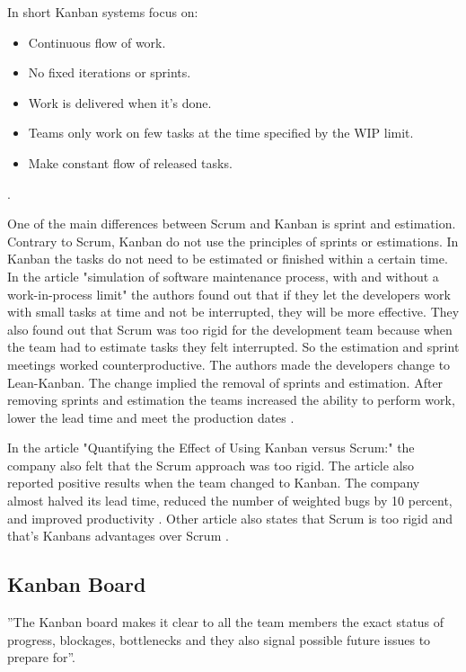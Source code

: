 \documentclass[UKenglish]{ifimaster}  %
\begin{document}
In short Kanban systems focus on:
\begin{itemize}
\item Continuous flow of work.
\item	No fixed iterations or sprints.
\item Work is delivered when it's done.
\item Teams only work on few tasks at the time specified by the WIP limit.
\item Make constant flow of released tasks.
\end{itemize}
\parencite{DavidAnderson}.


One of the main differences between Scrum and Kanban is sprint and estimation. Contrary to Scrum, Kanban do not use the principles of sprints or estimations. In Kanban the tasks do not need to be estimated or finished within a certain time. In the article "simulation of software maintenance process, with and without a work-in-process limit" \parencite{SMR:SMR1599} the authors found out that if they let the developers work with small tasks at time and not be interrupted, they will be more effective. They also found out that Scrum was too rigid for the development team because when the team had to estimate tasks they felt interrupted.  So the estimation and sprint meetings worked counterproductive. The authors made the developers change to Lean-Kanban.  The change implied the removal of sprints and estimation. After removing sprints and estimation the teams increased the ability to perform work, lower the lead time and meet the production dates \parencite{SMR:SMR1599}.

In the article "Quantifying the Effect of Using Kanban versus Scrum:" the company also felt that the Scrum approach was too rigid. The article also reported positive results when the team changed to Kanban.  The company almost halved its lead time, reduced the number of weighted bugs by 10 percent, and improved productivity \parencite{Dag}. Other article also states that Scrum is too rigid and that's Kanbans advantages over Scrum \parencite{beedle1999scrum} \parencite{brekkanintroducing} .  

\subsection {Kanban Board}
''The Kanban board makes it clear to all the team members the exact status of progress, blockages, bottlenecks and they also signal possible future issues to prepare for''\parencite{Joyce}.
\end{document}
